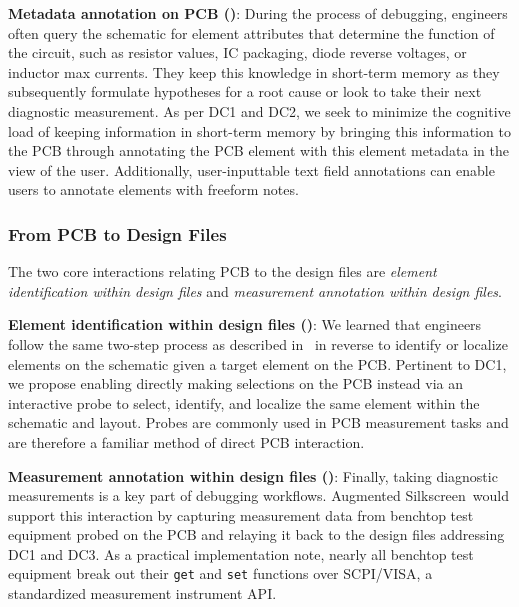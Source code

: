 \documentclass [11pt, proquest] {uwthesis}[2020/02/24]
\newcommand{\ASname}{Augmented Silkscreen}
\begin{document}
\textbf{Metadata annotation on PCB (\MetaDataOnPCB)}: During the process of debugging, engineers often query the schematic for element attributes that determine the function of the circuit, such as resistor values, IC packaging, diode reverse voltages, or inductor max currents. They keep this knowledge in short-term memory as they subsequently formulate hypotheses for a root cause or look to take their next diagnostic measurement.
As per DC1 and DC2,
we seek to minimize the cognitive load of keeping information in short-term memory by bringing this information to the PCB through annotating the PCB element with this element metadata in the view of the user.
Additionally, user-inputtable text field annotations can enable users to annotate elements with freeform notes.

\subsubsection{From PCB to Design Files}
The two core interactions relating PCB to the design files are \textit{element identification within design files} and \textit{measurement annotation within design files}.

\textbf{Element identification within design files (\ElemIdOnDesFiles)}: We learned that engineers follow the same two-step process as described in \ElemLocOnPCB~in reverse to identify or localize elements on the schematic given a target element on the PCB.
Pertinent to DC1, 
we propose enabling directly making selections on the PCB instead via an interactive probe to select, identify, and localize the same element within the schematic and layout. Probes are commonly used in PCB measurement tasks and are therefore a familiar method of direct PCB interaction.

\textbf{Measurement annotation within design files (\MeasOnDesFiles)}: Finally, taking diagnostic measurements is a key part of debugging workflows. \ASname\ would support this interaction by capturing measurement data from benchtop test equipment probed on the PCB and relaying it back to the design files addressing DC1 and DC3. As a practical implementation note, nearly all benchtop test equipment break out their \verb|get| and \verb|set| functions over SCPI/VISA, a standardized measurement instrument API.
\end{document}
